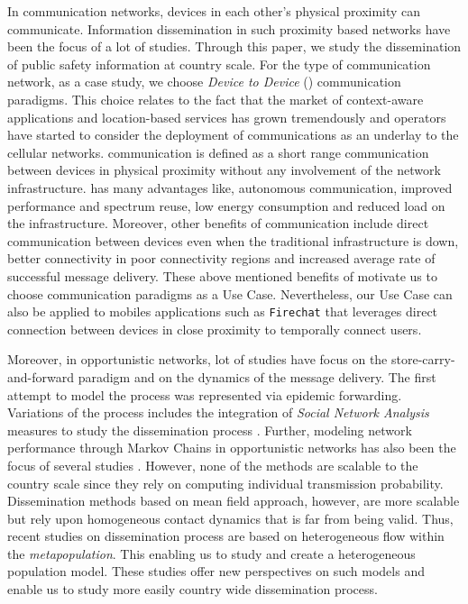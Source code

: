 \documentclass[review]{elsarticle}
\begin{document}
In communication networks, devices in each other's physical proximity can communicate. Information dissemination in such proximity based networks have been the focus of a lot of studies. Through this paper, we study the dissemination of public safety information at country scale. For the type of communication network, as a case study, we choose \emph{Device to Device} () communication paradigms. This choice relates to the fact that the market of context-aware applications and location-based services has grown tremendously and operators have started to consider the deployment of  communications as an underlay to the cellular networks.  communication is defined as a short range communication between devices in physical proximity without any involvement of the network infrastructure.  has many advantages like, autonomous communication, improved performance and spectrum reuse, low energy consumption and reduced load on the infrastructure. Moreover, other benefits of  communication include direct communication between devices even when the traditional infrastructure is down, better connectivity in poor connectivity regions and increased average rate of successful message delivery. These above mentioned benefits of  motivate us to choose  communication paradigms as a Use Case. Nevertheless, our Use Case can also be applied to mobiles applications such as \texttt{Firechat} \cite{firechat} that leverages direct connection between devices in close proximity to temporally connect users.

Moreover, in opportunistic networks, lot of studies have focus on the store-carry-and-forward paradigm and on the dynamics of the message delivery. The first attempt to model the process was represented via epidemic forwarding. Variations of the process includes the integration of \emph{Social Network Analysis} measures to study the dissemination process \cite{5677535, 4674358, Mtibaa2013180, Belblidia20121786}. Further, modeling network performance through Markov Chains in opportunistic networks has also been the focus of several studies \cite{Groenevelt2005210,AlHanbali2008463,4430783, Boldrini201456}. However, none of the methods are scalable to the country scale since they rely on computing individual transmission probability. Dissemination methods based on mean field approach, however, are more scalable \cite{Zhang:2007:PME:1242848.1243153,1597221} but rely upon homogeneous contact dynamics that is far from being valid. Thus, recent studies \cite{colizzaepidemic2008, balcanphase2011, polettoheterogeneous2012, wanghow2013} on dissemination process are based on heterogeneous flow within the \emph{metapopulation}. This  enabling us to study and create a heterogeneous population model. These studies offer new perspectives on such models and enable us to study more easily country wide dissemination process.
\end{document}
